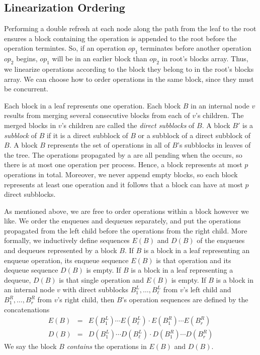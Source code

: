 \subsection{Linearization Ordering}

Performing a double refresh at each node along the path from the leaf to the root ensures 
a block containing the operation is appended to the root before the operation termintes.
So, if an operation $op_1$ terminates before another operation $op_2$ begins, 
$op_1$ will be in an earlier block than $op_2$ in root's blocks array.
Thus, we linearize operations according to the block they belong to in the root's blocks array.
We can choose how to order operations in the same block, since they must be concurrent.

Each block in a leaf represents one operation.
Each block $B$ in an internal node $v$ results from merging
several consecutive blocks from each of $v$'s children.
The merged blocks in $v$'s children are called the \emph{direct subblocks} of $B$.
A block $B'$ is a \emph{subblock} of $B$ if it is a direct subblock of $B$
or a subblock of a direct subblock of $B$.
A block $B$ represents the set of operations in all of $B$'s subblocks in leaves of the tree.
The operations propagated by a  are all pending when the  occurs,
so there is at most one operation per process.
Hence, a block represents at most $p$ operations in total.  
Moreover, we never append empty blocks, so 
each block represents at least one operation and it follows that a block can have at most $p$ direct subblocks.

As mentioned above, we are free to order operations within a block however we like.
We order the enqueues and dequeues separately, and put the 
operations propagated from the left child before the operations from the right child.
More formally, we inductively define sequences $E(B)$ and $D(B)$ of the enqueues and dequeues
represented by a block $B$.
If $B$ is a block in a leaf representing an enqueue operation, its enqueue sequence $E(B)$ is that operation
and its dequeue sequence $D(B)$ is empty.  If $B$ is a block in a leaf representing a dequeue, $D(B)$ is that single operation and $E(B)$ is empty.
If $B$ is a block in an internal node $v$ with direct subblocks $B^L_1, \ldots, B^L_\ell$ from 
$v$'s left child
and $B^R_1,\ldots,B^R_r$ from $v$'s right child, then $B$'s operation sequences are defined by the concatenations 
\begin{eqnarray}
E(B) &=& E(B^L_1)\cdots E(B^L_\ell)\cdot E(B^R_1) \cdots E(B^R_r)\nonumber\\
D(B) &=& D(B^L_1)\cdots D(B^L_\ell)\cdot D(B^R_1) \cdots D(B^R_r)\label{defSeqs}
\end{eqnarray}
We say the block $B$ \emph{contains} the operations in $E(B)$ and $D(B)$.

